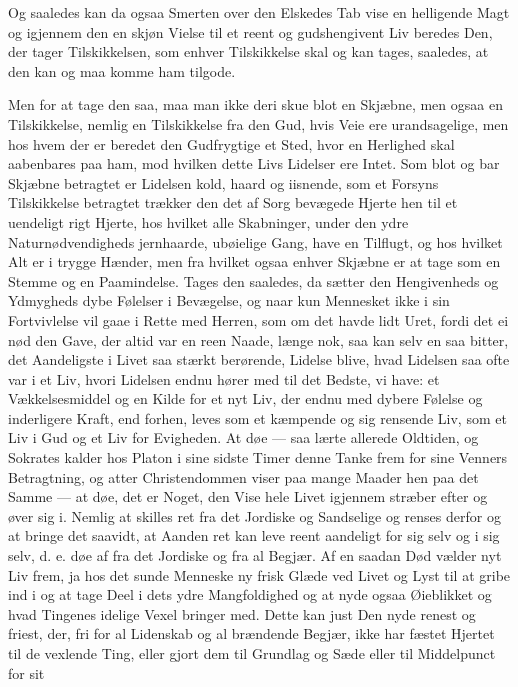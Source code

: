 \documentclass[12pt,a4paper]{book}
\newcommand{\apage}[1]{\marginnote{\footnotesize\textit{[#1]}}}
\begin{document}
Og saaledes kan da ogsaa Smerten over den Elskedes Tab vise en helligende
Magt og igjennem den en skjøn Vielse til et reent og gudshengivent Liv
beredes \apage{171} Den, der tager Tilskikkelsen, som enhver Tilskikkelse skal og kan
tages, saaledes, at den kan og maa komme ham tilgode.

Men for at tage den saa, maa man ikke deri skue blot en Skjæbne, men
ogsaa en Tilskikkelse, nemlig en Tilskikkelse fra den Gud, hvis Veie ere
urandsagelige, men hos hvem der er beredet den Gudfrygtige et Sted, hvor
en Herlighed skal aabenbares paa ham, mod hvilken dette Livs Lidelser ere
Intet. Som blot og bar Skjæbne betragtet er Lidelsen kold, haard og
iisnende, som et Forsyns Tilskikkelse betragtet trækker den det af Sorg
bevægede Hjerte hen til et uendeligt rigt Hjerte, hos hvilket alle
Skabninger, under den ydre Naturnødvendigheds jernhaarde, ubøielige Gang,
have en Tilflugt, og hos hvilket Alt er i trygge Hænder, men fra hvilket
ogsaa enhver Skjæbne er at tage som en Stemme og en Paamindelse. Tages
den saaledes, da sætter den Hengivenheds og Ydmygheds dybe Følelser i
Bevægelse, og naar kun Mennesket ikke i sin Fortvivlelse vil gaae i Rette
med Herren, som om det havde lidt Uret, fordi det ei nød den Gave, der
altid var en reen Naade, længe nok, saa kan selv en saa bitter, det
Aandeligste i Livet saa stærkt berørende, Lidelse blive, hvad Lidelsen
saa ofte var i et Liv, hvori Lidelsen endnu hører med til det Bedste, vi
have: et Vækkelsesmiddel og en Kilde for et nyt Liv, der endnu med dybere
Følelse og inderligere Kraft, end forhen, leves som et kæmpende og sig
rensende Liv, som et \apage{172} Liv i Gud og et Liv for Evigheden. At døe --- saa
lærte allerede Oldtiden, og Sokrates kalder hos Platon i sine sidste
Timer denne Tanke frem for sine Venners Betragtning, og atter
Christendommen viser paa mange Maader hen paa det Samme --- at døe, det er
Noget, den Vise hele Livet igjennem stræber efter og øver sig i. Nemlig
at skilles ret fra det Jordiske og Sandselige og renses derfor og at
bringe det saavidt, at Aanden ret kan leve reent aandeligt for sig selv
og i sig selv, d. e. døe af fra det Jordiske og fra al Begjær. Af en
saadan Død vælder nyt Liv frem, ja hos det sunde Menneske ny frisk Glæde
ved Livet og Lyst til at gribe ind i og at tage Deel i dets ydre
Mangfoldighed og at nyde ogsaa Øieblikket og hvad Tingenes idelige Vexel
bringer med. Dette kan just Den nyde renest og friest, der, fri for al
Lidenskab og al brændende Begjær, ikke har fæstet Hjertet til de vexlende
Ting, eller gjort dem til Grundlag og Sæde eller til Middelpunct for sit
\end{document}
